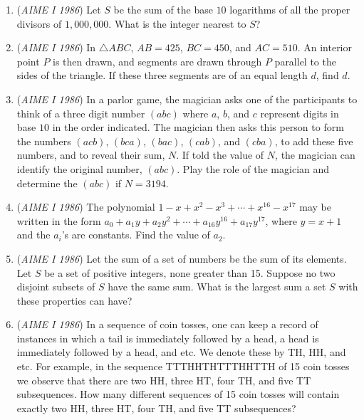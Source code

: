 \begin{enumerate}
 

	\item (\textit{AIME I 1986}) Let $S$ be the sum of the base $10$ logarithms of all the proper divisors of $1{,}000{,}000$. What is the integer nearest to $S$?


 

	\item (\textit{AIME I 1986}) In $\triangle ABC$, $AB= 425$, $BC=450$, and $AC=510$. An interior point $P$ is then drawn, and segments are drawn through $P$ parallel to the sides of the triangle. If these three segments are of an equal length $d$, find $d$.


 

	\item (\textit{AIME I 1986}) In a parlor game, the magician asks one of the participants to think of a three digit number $(abc)$ where $a$, $b$, and $c$ represent digits in base $10$ in the order indicated. The magician then asks this person to form the numbers $(acb)$, $(bca)$, $(bac)$, $(cab)$, and $(cba)$, to add these five numbers, and to reveal their sum, $N$. If told the value of $N$, the magician can identify the original number, $(abc)$. Play the role of the magician and determine the $(abc)$ if $N= 3194$.


 

	\item (\textit{AIME I 1986}) The polynomial $1-x+x^2-x^3+\cdots+x^{16}-x^{17}$ may be written in the form $a_0+a_1y+a_2y^2+\cdots +a_{16}y^{16}+a_{17}y^{17}$, where $y=x+1$ and the $a_i$'s are constants. Find the value of $a_2$.


 

	\item (\textit{AIME I 1986}) Let the sum of a set of numbers be the sum of its elements. Let $S$ be a set of positive integers, none greater than 15. Suppose no two disjoint subsets of $S$ have the same sum. What is the largest sum a set $S$ with these properties can have?


 

	\item (\textit{AIME I 1986}) In a sequence of coin tosses, one can keep a record of instances in which a tail is immediately followed by a head, a head is immediately followed by a head, and etc. We denote these by TH, HH, and etc. For example, in the sequence TTTHHTHTTTHHTTH of 15 coin tosses we observe that there are two HH, three HT, four TH, and five TT subsequences. How many different sequences of 15 coin tosses will contain exactly two HH, three HT, four TH, and five TT subsequences?



\end{enumerate}

